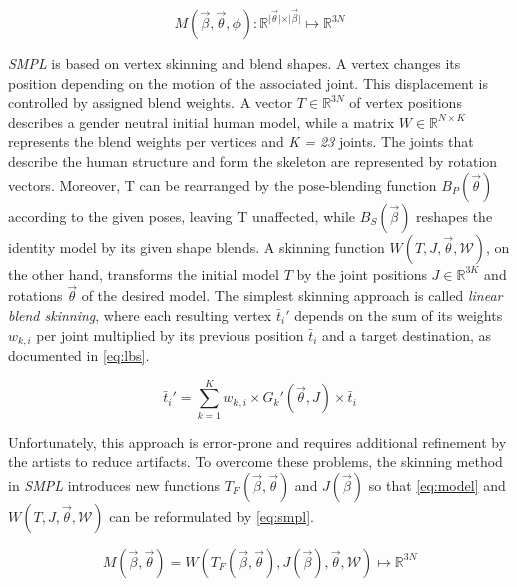 \begin{equation}
\label{eq:model}
M(\vec{\beta},\vec{\theta},\phi) : \mathbb{R}^{\vert \vec{\theta} \vert \times \vert \vec{\beta} \vert} \mapsto \mathbb{R}^{3N}
\end{equation}

\emph{SMPL} is based on vertex skinning and blend shapes. A vertex changes its position depending on the motion of the associated joint. This displacement is controlled by assigned blend weights. A vector $T \in \mathbb{R}^{3N}$ of vertex positions describes a gender neutral initial human model, while a matrix $W \in \mathbb{R}^{N \times K}$ represents the blend weights per vertices and \emph{K = 23} joints. The joints that describe the human structure and form the skeleton are represented by rotation vectors. Moreover, T can be rearranged by the pose-blending function $B_{P}(\vec{\theta})$ according to the given poses, leaving T unaffected, while $B_{S}(\vec{\beta})$ reshapes the identity model by its given shape blends. A skinning function $W(T,J,\vec{\theta},\mathcal{W})$, on the other hand, transforms the initial model $T$ by the joint positions $J \in \mathbb{R}^{3K}$ and rotations $\vec{\theta}$ of the desired model. The simplest skinning approach is called \emph{linear blend skinning}, where each resulting vertex $\bar{t}_{i}'$ depends on the sum of its weights $w_{k,i}$ per joint multiplied by its previous position $\bar{t}_{i}$ and a target destination, as documented in \autoref{eq:lbs}. 

\begin{equation}
\label{eq:lbs}
\bar{t}_{i}' = \sum_{k=1}^{K} w_{k,i} \times G_{k}'(\vec{\theta},J) \times \bar{t}_{i}
\end{equation}

Unfortunately, this approach is error-prone and requires additional refinement by the artists to reduce artifacts. To overcome these problems, the skinning method in \emph{SMPL} introduces new functions $T_{F}(\vec{\beta},\vec{\theta})$ and $J(\vec{\beta})$ so that \autoref{eq:model} and $W(T,J,\vec{\theta},\mathcal{W})$ can be reformulated by \autoref{eq:smpl}.

\begin{equation}
\label{eq:smpl}
M(\vec{\beta},\vec{\theta}) = W(T_{F}(\vec{\beta},\vec{\theta}),J(\vec{\beta}),\vec{\theta},\mathcal{W}) \mapsto \mathbb{R}^{3N}
\end{equation}

